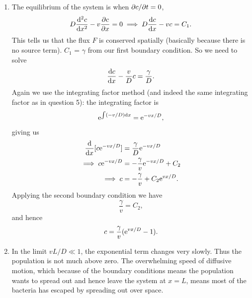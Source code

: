 \documentclass[a4paper, 12pt]{article}
\begin{document}
\begin{enumerate}[label={\bf \arabic{*}.\;}, ref={\arabic{*}},itemsep=3ex, left=0ex]
{\begin{enumerate}[label=(\alph*)]
        \item{
            The equilibrium of the system is when $\pd{c}{t} = 0$,
            \begin{equation}
              D\fdd{c}{x} - v\pd{c}{x}= 0 \implies  D\fd{c}{x} - vc = C_1.
            \end{equation}
            This tells us that the flux $F$ is conserved spatially (basically because there is no source term). $C_1$ = $\gamma$ from our first boundary condition. So we need to solve
            \begin{equation}
              \fd{c}{x} - \frac{v}{D}c = \frac{\gamma}{D}.
            \end{equation}
            Again we use the integrating factor method (and indeed the same integrating factor as in question 5): the integrating factor is
            \begin{equation}
              \mathrm{e}^{\int(-v/D){\mathrm d} x} = \mathrm{e}^{-vx/D},
            \end{equation}
            giving us
            \begin{align}
              \fd{}{x}[c\e^{-vx/D}] & = \frac{\gamma}{D}\e^{-vx/D}\\
              \implies c\e^{-vx/D} &= -\frac{\gamma}{v}\e^{-vx/D} + C_2\\
              \implies c &= -\frac{\gamma}{v} + C_2\e^{vx/D}.
            \end{align}
            Applying the second boundary condition we have
            \begin{equation}
              \frac{\gamma}{v} = C_2,
            \end{equation}
            and hence
            \begin{equation}
              c = \frac{\gamma}{v}(\mathrm{e} ^{vx/D}-1).
            \end{equation}
          }
        \item{In the limit $vL/D \ll 1$, the exponential term changes very slowly. Thus the population is not much above zero. The  overwhelming speed of diffusive motion, which because of the boundary conditions means the population wants to spread out and hence leave the system at $x=L$, means most of the bacteria has escaped by spreading out over space.
          }
      \end{enumerate}
    }



\end{enumerate}
\end{document}
